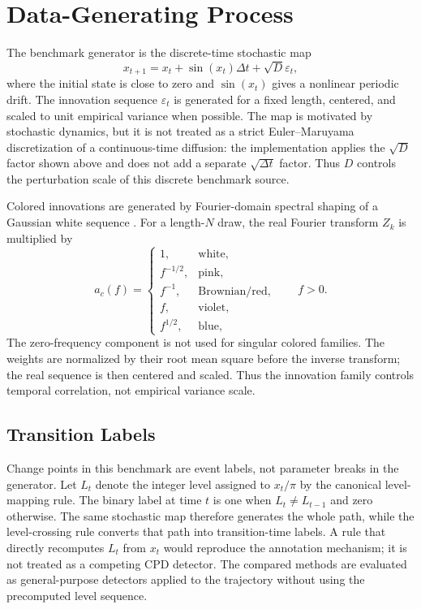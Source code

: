 ﻿\section{Data-Generating Process}

The benchmark generator is the discrete-time stochastic map
\begin{equation}
  x_{t+1}=x_t+\sin(x_t)\Delta t+\sqrt{D}\varepsilon_t,
\end{equation}
where the initial state is close to zero and \(\sin(x_t)\) gives a nonlinear
periodic drift. The innovation sequence \(\varepsilon_t\) is generated for a
fixed length, centered, and scaled to unit empirical variance when possible.
The map is motivated by stochastic dynamics, but it is not treated as a strict
Euler--Maruyama discretization of a continuous-time diffusion: the
implementation applies the \(\sqrt{D}\) factor shown above and does not add a
separate \(\sqrt{\Delta t}\) factor. Thus \(D\) controls the perturbation scale
of this discrete benchmark source.

Colored innovations are generated by Fourier-domain spectral shaping of a
Gaussian white sequence \cite{timmer1995,kasdin1995}. For a length-\(N\) draw,
the real Fourier transform \(Z_k\) is multiplied by
\begin{equation}
  a_c(f)=
  \begin{cases}
    1, & \text{white},\\
    f^{-1/2}, & \text{pink},\\
    f^{-1}, & \text{Brownian/red},\\
    f, & \text{violet},\\
    f^{1/2}, & \text{blue},
  \end{cases}
  \qquad f>0 .
\end{equation}
The zero-frequency component is not used for singular colored families. The
weights are normalized by their root mean square before the inverse transform;
the real sequence is then centered and scaled. Thus the innovation family
controls temporal correlation, not empirical variance scale.

\subsection{Transition Labels}

Change points in this benchmark are event labels, not parameter breaks in the
generator. Let \(L_t\) denote the integer level assigned to \(x_t/\pi\) by the
canonical level-mapping rule. The binary label at time \(t\) is one when
\(L_t \ne L_{t-1}\) and zero otherwise. The same stochastic map therefore
generates the whole path, while the level-crossing rule converts that path into
transition-time labels. A rule that directly recomputes \(L_t\) from \(x_t\)
would reproduce the annotation mechanism; it is not treated as a competing CPD
detector. The compared methods are evaluated as general-purpose detectors
applied to the trajectory without using the precomputed level sequence.

